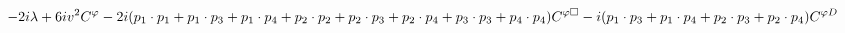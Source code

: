 %
\begin{dmath*}
%
  -  2 i \lambda   +  6 i v^2C^{\varphi }  -  2 i(p_{1}\nobreak\cdot\nobreak{}p_{1} + p_{1}\nobreak\cdot\nobreak{}p_{3} + p_{1}\nobreak\cdot\nobreak{}p_{4} + p_{2}\nobreak\cdot\nobreak{}p_{2} + p_{2}\nobreak\cdot\nobreak{}p_{3} + p_{2}\nobreak\cdot\nobreak{}p_{4} + p_{3}\nobreak\cdot\nobreak{}p_{3} + p_{4}\nobreak\cdot\nobreak{}p_{4}) C^{ \varphi  \Box}  -  i(p_{1}\nobreak\cdot\nobreak{}p_{3} + p_{1}\nobreak\cdot\nobreak{}p_{4} + p_{2}\nobreak\cdot\nobreak{}p_{3} + p_{2}\nobreak\cdot\nobreak{}p_{4}) C^{ \varphi  D}
%
\end{dmath*}
%
